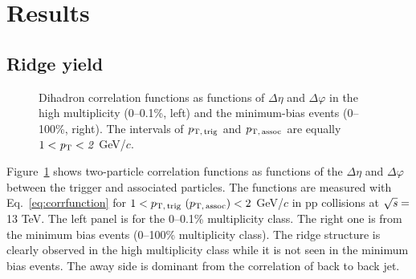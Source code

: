 
\section {Results}
\label{sec:results}

\subsection{Ridge yield}

\begin{figure}[h!]
	\centering
	\caption{ Dihadron correlation functions as functions of $\Delta\eta$ and $\Delta\varphi$ in the high multiplicity (0--0.1\%, left) and the minimum-bias events (0--100\%, right). The intervals of $p_\mathrm{T,\,trig}$ and $p_\mathrm{T,\,assoc}$ are equally $1 < \it{p}_{\rm{T}} < 2$ GeV/$c$. }
	\label{fig:PlotCorrMBHMT}
\end{figure}

Figure~\ref{fig:PlotCorrMBHMT} shows two-particle correlation functions as functions of the $\Delta \eta$ and $\Delta \varphi$ between the trigger and associated particles. The functions are measured with Eq.~\ref{eq:corrfunction} for $1 < p_\mathrm{T,\,trig}~\mathrm (p_\mathrm{T,\,assoc}) < 2$ GeV/$c$ in pp collisions at $\sqrt{\it{s}} = $\unit{13} {\rm{}TeV}. The left panel is for the 0--0.1\% multiplicity class. The right one is from the minimum bias events (0--100\% multiplicity class). The ridge structure is clearly observed in the high multiplicity class while it is not seen in the minimum bias events. The away side is dominant from the correlation of back to back jet.
 

